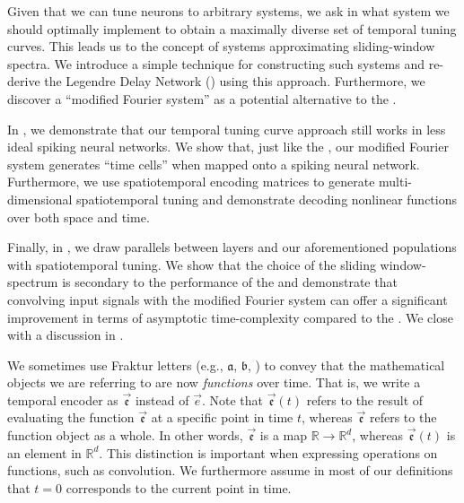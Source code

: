 Given that we can tune neurons to arbitrary \LTI systems, we ask in  what \LTI system we should optimally implement to obtain a maximally diverse set of temporal tuning curves.
This leads us to the concept of \LTI systems approximating sliding-window spectra.
We introduce a simple technique for constructing such \LTI systems and re-derive the Legendre Delay Network (\LDN) using this approach.
Furthermore, we discover a \enquote{modified Fourier system} as a potential alternative to the \LDN.

In , we demonstrate that our temporal tuning curve approach still works in less ideal spiking neural networks.
We show that, just like the \LDN, our modified Fourier system generates \enquote{time cells} when mapped onto a spiking neural network.
Furthermore, we use spatiotemporal encoding matrices to generate multi-dimensional spatiotemporal tuning and demonstrate decoding nonlinear functions over both space and time.

Finally, in , we draw parallels between \LMU layers and our aforementioned \NEF populations with spatiotemporal tuning.
We show that the choice of the sliding window-spectrum is secondary to the performance of the \LMU and demonstrate that convolving input signals with the modified Fourier system can offer a significant improvement in terms of asymptotic time-complexity compared to the \LDN.
We close with a discussion in .

\begin{Notation}
We sometimes use Fraktur letters (e.g., $\mathfrak{a}$, $\mathfrak{b}$, \textellipsis) to convey that the mathematical objects we are referring to are now \emph{functions} over time.
That is, we write a temporal encoder as $\vec{\mathfrak{e}}$ instead of $\vec e$.
Note that $\vec{\mathfrak{e}}(t)$ refers to the result of evaluating the function $\vec{\mathfrak{e}}$ at a specific point in time $t$, whereas $\vec{\mathfrak{e}}$ refers to the function object as a whole.
In other words, $\vec{\mathfrak{e}}$ is a map $\mathbb{R} \longrightarrow \mathbb{R}^d$, whereas $\vec{\mathfrak{e}}(t)$ is an element in $\mathbb{R}^d$.
This distinction is important when expressing operations on functions, such as convolution.
We furthermore assume in most of our definitions that $t = 0$ corresponds to the current point in time.
\end{Notation}
